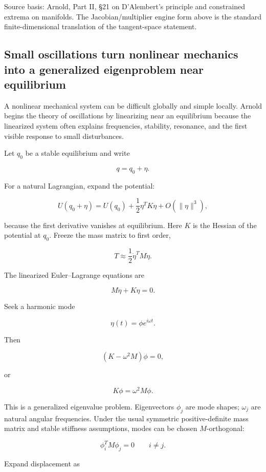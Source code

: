 Source basis: Arnold, Part II, §21 on D'Alembert's principle and constrained extrema on manifolds. The Jacobian/multiplier engine form above is the standard finite-dimensional translation of the tangent-space statement.

\subsection{Small oscillations turn nonlinear mechanics into a generalized eigenproblem near equilibrium}\label{02-foundations-ii-ch039-small-oscillations-turn-nonlinear-mechanics-into-a-generalized-eigenproblem-near-equilibrium}

A nonlinear mechanical system can be difficult globally and simple locally. Arnold begins the theory of oscillations by linearizing near an equilibrium because the linearized system often explains frequencies, stability, resonance, and the first visible response to small disturbances.

Let \(q_0\) be a stable equilibrium and write

\[
q=q_0+\eta.
\]

For a natural Lagrangian, expand the potential:

\[
U(q_0+\eta)
=
U(q_0)
+
\frac12\eta^T K\eta
+
O(\|\eta\|^3),
\]

because the first derivative vanishes at equilibrium. Here \(K\) is the Hessian of the potential at \(q_0\). Freeze the mass matrix to first order,

\[
T
\approx
\frac12\dot\eta^T M\dot\eta.
\]

The linearized Euler--Lagrange equations are

\[
M\ddot\eta+K\eta=0.
\]

Seek a harmonic mode

\[
\eta(t)=\phi e^{i\omega t}.
\]

Then

\[
(K-\omega^2M)\phi=0,
\]

or

\[
\boxed{
K\phi=\omega^2M\phi.
}
\]

This is a generalized eigenvalue problem. Eigenvectors \(\phi_j\) are mode shapes; \(\omega_j\) are natural angular frequencies. Under the usual symmetric positive-definite mass matrix and stable stiffness assumptions, modes can be chosen \(M\)-orthogonal:

\[
\phi_i^T M\phi_j=0
\qquad i\neq j.
\]

Expand displacement as

